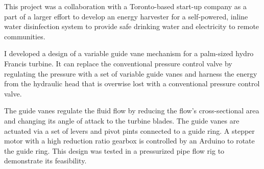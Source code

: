
This project was a collaboration with a Toronto-based start-up company as a part of a larger effort to develop an energy harvester for a self-powered, inline water disinfection system to provide safe drinking water and electricity to remote communities.

I developed a design of a variable guide vane mechanism for a palm-sized hydro Francis turbine. It can replace the conventional pressure control valve by regulating the pressure with a set of variable guide vanes and harness the energy from the hydraulic head that is overwise lost with a conventional pressure control valve. 

The guide vanes regulate the fluid flow by reducing the flow's cross-sectional area and changing its angle of attack to the turbine blades. The guide vanes are actuated via a set of levers and pivot pints connected to a guide ring. A stepper motor with a high reduction ratio gearbox is controlled by an Arduino to rotate the guide ring. This design was tested in a pressurized pipe flow rig to demonstrate its feasibility.
